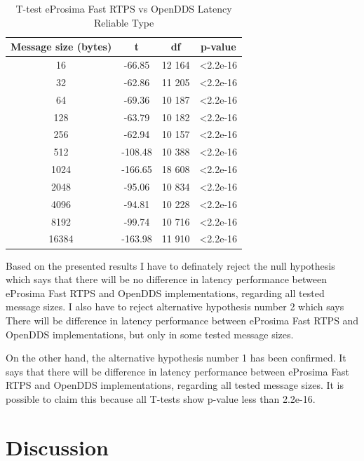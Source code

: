 \documentclass{csfourzero}
\begin{document}
\begin{table}[!ht]
	\centering
	\caption{T-test eProsima Fast RTPS vs OpenDDS Latency Reliable Type}
	\label{T-test-latency-table-reliable}
	\begin{tabular}{|c|c|c|c|}
		\hline 
		Message size (bytes) & t & df & p-value \\ 
		\hline 
		16 & -66.85 & 12 164 & \textless 2.2e-16 \\ 
		\hline 
		32 & -62.86 & 11 205 & \textless 2.2e-16 \\ 
		\hline 
		64 & -69.36 & 10 187 & \textless 2.2e-16 \\ 
		\hline 
		128 & -63.79 & 10 182 & \textless 2.2e-16 \\ 
		\hline 
		256 & -62.94 & 10 157 & \textless 2.2e-16 \\ 
		\hline 
		512 & -108.48 & 10 388 & \textless 2.2e-16 \\ 
		\hline 
		1024 & -166.65 & 18 608 & \textless 2.2e-16 \\ 
		\hline 
		2048 & -95.06 & 10 834 & \textless 2.2e-16 \\ 
		\hline 
		4096 & -94.81 & 10 228 & \textless 2.2e-16 \\ 
		\hline 
		8192 & -99.74 & 10 716 & \textless 2.2e-16 \\ 
		\hline 
		16384 & -163.98 & 11 910 & \textless 2.2e-16 \\ 
		\hline 
	\end{tabular} 
\end{table}

Based on the presented results I have to definately reject the null hypothesis which says that there will be no difference in latency performance between eProsima Fast RTPS and OpenDDS implementations, regarding all tested message sizes. I also have to reject alternative hypothesis number 2 which says There will be difference in latency performance between eProsima Fast RTPS and OpenDDS implementations, but only in some tested message sizes.

On the other hand, the alternative hypothesis number 1 has been confirmed. It says that there will be difference in latency performance between eProsima Fast RTPS and OpenDDS implementations, regarding all tested message sizes. It is possible to claim this because all T-tests show p-value less than 2.2e-16.


\section{Discussion}
\label{sec:discuss}
\end{document}
